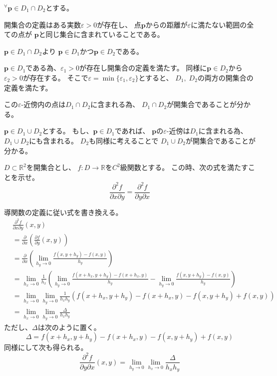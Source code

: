 \documentclass[12pt,b5paper]{ltjsarticle}
\begin{document}
${}^{\forall}\bm{p}\in D_1\cap D_2$とする。

開集合の定義はある実数$\varepsilon >0$が存在し、
点$\bm{p}$からの距離が$\varepsilon$に満たない範囲の全ての点が
$\bm{p}$と同じ集合に含まれていることである。

$\bm{p}\in D_1\cap D_2$より
$\bm{p}\in D_1$かつ$\bm{p}\in D_2$である。

$\bm{p}\in D_1$である為、$\varepsilon_1>0$が存在し開集合の定義を満たす。
同様に$\bm{p}\in D_2$から$\varepsilon_2>0$が存在する。
そこで$\varepsilon = \min\{\varepsilon_1, \varepsilon_2\}$とすると、
$D_1,\;D_2$の両方の開集合の定義を満たす。

この$\varepsilon$-近傍内の点は$D_1 \cap D_2$に含まれる為、
$D_1 \cap D_2$が開集合であることが分かる。

$\bm{p}\in D_1 \cup D_2$とする。
もし、$\bm{p}\in D_1$であれば、
$\bm{p}$の$\varepsilon$-近傍は$D_1$に含まれる為、$D_1 \cup D_2$にも含まれる。
$D_2$も同様に考えることで
$D_1 \cup D_2$が開集合であることが分かる。


\dotfill


\newpage



$D\subset \mathbb{R}^2$を開集合とし、
$f:D\rightarrow \mathbb{R}$を$C^2$級関数とする。
この時、次の式を満たすことを示せ。
\begin{equation}
 \frac{\partial^2 f}{\partial x\partial y}
  =\frac{\partial^2 f}{\partial y\partial x}
\end{equation}


導関数の定義に従い式を書き換える。
\begin{align}
 & \frac{\partial^2 f}{\partial x\partial y}(x,y)\\
 &= \frac{\partial}{\partial x}\left(\frac{\partial f}{\partial y} (x,y)\right)\\
 &= \frac{\partial}{\partial x}\left(\lim_{h_y\rightarrow 0}\frac{f(x,y+h_y)-f(x,y)}{h_y}\right)\\
 &=\lim_{h_x\rightarrow 0} \frac{1}{h_x}\left(
 \lim_{h_y\rightarrow 0}\frac{f(x+h_x,y+h_y)-f(x+h_x,y)}{h_y}
 - \lim_{h_y\rightarrow 0}\frac{f(x,y+h_y)-f(x,y)}{h_y}
 \right)\\
 &=\lim_{h_x\rightarrow 0} \lim_{h_y\rightarrow 0}
 \frac{1}{h_xh_y}\left( f(x+h_x,y+h_y)-f(x+h_x,y) - f(x,y+h_y)+f(x,y) \right)\\
 &= \lim_{h_x\rightarrow 0} \lim_{h_y\rightarrow 0} \frac{\Delta}{h_xh_y}
\end{align}
ただし、$\Delta$は次のように置く。
\begin{equation}
 \Delta =f(x+h_x,y+h_y)-f(x+h_x,y) - f(x,y+h_y)+f(x,y)\label{Del0}
\end{equation}
同様にして次も得られる。
\begin{equation}
 \frac{\partial^2 f}{\partial y\partial x}(x,y)
 =\lim_{h_y\rightarrow 0} \lim_{h_x\rightarrow 0}
 \frac{\Delta}{h_xh_y}
\end{equation}
\end{document}
